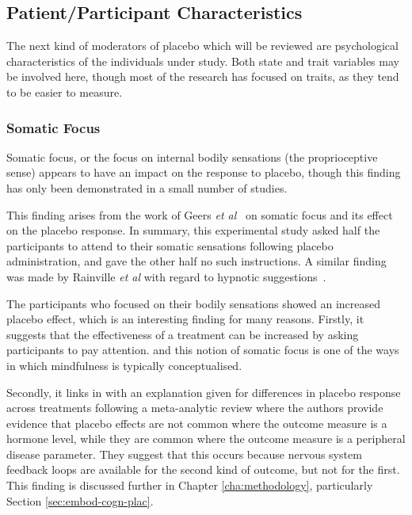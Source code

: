 \subsection{Patient/Participant Characteristics}
\label{sec:psych-char}

The next  kind of moderators of placebo which will be reviewed are psychological characteristics of the individuals under study. Both state and trait variables may be involved here, though most of the research has focused on traits, as they tend to be easier to measure. 

\subsubsection{Somatic Focus}

Somatic focus, or the focus on internal bodily sensations (the proprioceptive sense) appears to have an impact on the response to placebo, though this finding has only been demonstrated in a small number of studies. 

This finding arises from the work of Geers \textit{et al}~\cite{Geers2006}  on somatic focus and its effect on the placebo response. In summary, this experimental study asked half the participants to attend to their somatic sensations following placebo administration, and gave the other half no such instructions. A similar finding was made by Rainville \textit{et al} with regard to hypnotic suggestions~\cite{Price2008}. 

The participants who focused on their bodily sensations showed an increased placebo effect, which is an interesting finding for many reasons. Firstly, it suggests that the effectiveness of a treatment can be increased by asking participants to pay attention.%
and this notion of somatic focus is one of the ways in which mindfulness is typically conceptualised. 

Secondly, it links in with an explanation given for differences in placebo response across treatments following a meta-analytic review \cite{Meissner2007} where the authors provide evidence that placebo effects are not common where the outcome measure is a hormone level, while they are common where the outcome measure is a peripheral disease parameter. They suggest that this occurs because nervous system feedback loops are available for the second kind of outcome, but not for the first. This finding is discussed further in Chapter \ref{cha:methodology}, particularly Section \ref{sec:embod-cogn-plac}. 

